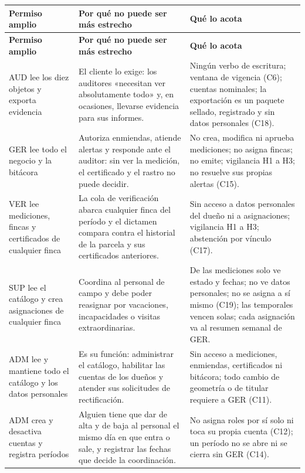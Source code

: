 \documentclass[11pt,letterpaper]{article}
\newcommand{\cab}[1]{\textbf{\rmfamily #1}}
\begin{document}
{\small
\renewcommand{\arraystretch}{1.25}
\begin{longtable}{@{}L{3.9cm} L{6.3cm} L{5.4cm}@{}}
\toprule
\cab{Permiso amplio} & \cab{Por qué no puede ser más estrecho} & \cab{Qué lo acota} \\
\midrule
\endfirsthead
\toprule
\cab{Permiso amplio} & \cab{Por qué no puede ser más estrecho} & \cab{Qué lo acota} \\
\midrule
\endhead
\bottomrule
\endfoot
AUD lee los diez objetos y exporta evidencia &
El cliente lo exige: los auditores «necesitan ver absolutamente todo» y, en ocasiones, llevarse
evidencia para sus informes. &
Ningún verbo de escritura; ventana de vigencia (C6); cuentas nominales; la exportación es un paquete sellado, registrado y sin datos personales (C18). \\
GER lee todo el negocio y la bitácora &
Autoriza enmiendas, atiende alertas y responde ante el auditor: sin ver la medición, el certificado y el rastro no puede decidir. &
No crea, modifica ni aprueba mediciones; no asigna fincas; no emite; vigilancia H1 a H3; no resuelve sus propias alertas (C15). \\
VER lee mediciones, fincas y certificados de cualquier finca &
La cola de verificación abarca cualquier finca del período y el dictamen compara contra el historial de la parcela y sus certificados anteriores. &
Sin acceso a datos personales del dueño ni a asignaciones; vigilancia H1 a H3; abstención por vínculo (C17). \\
SUP lee el catálogo y crea asignaciones de cualquier finca &
Coordina al personal de campo y debe poder reasignar por vacaciones, incapacidades o visitas extraordinarias. &
De las mediciones solo ve estado y fechas; no ve datos personales; no se asigna a sí mismo (C19); las temporales vencen solas; cada asignación va al resumen semanal de GER. \\
ADM lee y mantiene todo el catálogo y los datos personales &
Es su función: administrar el catálogo, habilitar las cuentas de los dueños y atender sus solicitudes de rectificación. &
Sin acceso a mediciones, enmiendas, certificados ni bitácora; todo cambio de geometría o de titular requiere a GER (C11). \\
ADM crea y desactiva cuentas y registra períodos &
Alguien tiene que dar de alta y de baja al personal el mismo día en que entra o sale, y registrar las fechas que decide la coordinación. &
No asigna roles por sí solo ni toca su propia cuenta (C12); un período no se abre ni se cierra sin GER (C14). \\

\end{longtable}}
\end{document}

